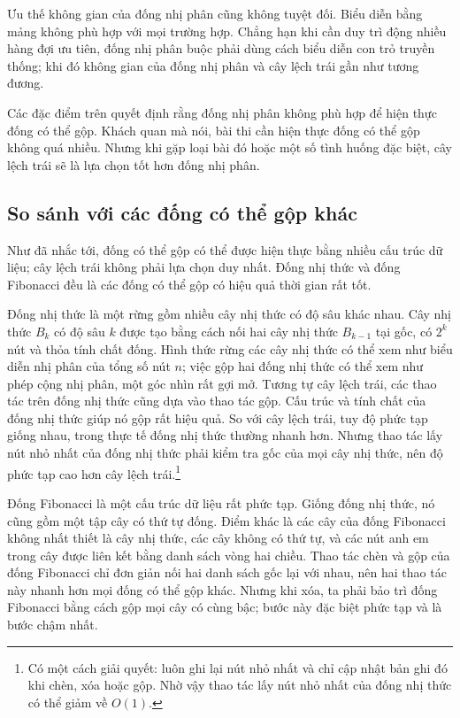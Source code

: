 \documentclass[11pt]{article}
\begin{document}
Ưu thế không gian của đống nhị phân cũng không tuyệt đối. Biểu diễn bằng mảng
không phù hợp với mọi trường hợp. Chẳng hạn khi cần duy trì động nhiều hàng đợi
ưu tiên, đống nhị phân buộc phải dùng cách biểu diễn con trỏ truyền thống; khi
đó không gian của đống nhị phân và cây lệch trái gần như tương đương.

Các đặc điểm trên quyết định rằng đống nhị phân không phù hợp để hiện thực đống
có thể gộp. Khách quan mà nói, bài thi cần hiện thực đống có thể gộp không quá
nhiều. Nhưng khi gặp loại bài đó hoặc một số tình huống đặc biệt, cây lệch trái
sẽ là lựa chọn tốt hơn đống nhị phân.

\subsection{So sánh với các đống có thể gộp khác}

Như đã nhắc tới, đống có thể gộp có thể được hiện thực bằng nhiều cấu trúc dữ
liệu; cây lệch trái không phải lựa chọn duy nhất. Đống nhị thức và đống
Fibonacci đều là các đống có thể gộp có hiệu quả thời gian rất tốt.

Đống nhị thức là một rừng gồm nhiều cây nhị thức có độ sâu khác nhau. Cây nhị
thức \(B_k\) có độ sâu \(k\) được tạo bằng cách nối hai cây nhị thức
\(B_{k-1}\) tại gốc, có \(2^k\) nút và thỏa tính chất đống. Hình thức rừng các
cây nhị thức có thể xem như biểu diễn nhị phân của tổng số nút \(n\); việc gộp
hai đống nhị thức có thể xem như phép cộng nhị phân, một góc nhìn rất gợi mở.
Tương tự cây lệch trái, các thao tác trên đống nhị thức cũng dựa vào thao tác
gộp. Cấu trúc và tính chất của đống nhị thức giúp nó gộp rất hiệu quả. So với
cây lệch trái, tuy độ phức tạp giống nhau, trong thực tế đống nhị thức thường
nhanh hơn. Nhưng thao tác lấy nút nhỏ nhất của đống nhị thức phải kiểm tra gốc
của mọi cây nhị thức, nên độ phức tạp cao hơn cây lệch trái.\footnote{Có một
cách giải quyết: luôn ghi lại nút nhỏ nhất và chỉ cập nhật bản ghi đó khi chèn,
xóa hoặc gộp. Nhờ vậy thao tác lấy nút nhỏ nhất của đống nhị thức có thể giảm
về \(O(1)\).}

Đống Fibonacci là một cấu trúc dữ liệu rất phức tạp. Giống đống nhị thức, nó
cũng gồm một tập cây có thứ tự đống. Điểm khác là các cây của đống Fibonacci
không nhất thiết là cây nhị thức, các cây không có thứ tự, và các nút anh em
trong cây được liên kết bằng danh sách vòng hai chiều. Thao tác chèn và gộp của
đống Fibonacci chỉ đơn giản nối hai danh sách gốc lại với nhau, nên hai thao tác
này nhanh hơn mọi đống có thể gộp khác. Nhưng khi xóa, ta phải bảo trì đống
Fibonacci bằng cách gộp mọi cây có cùng bậc; bước này đặc biệt phức tạp và là
bước chậm nhất.
\end{document}
